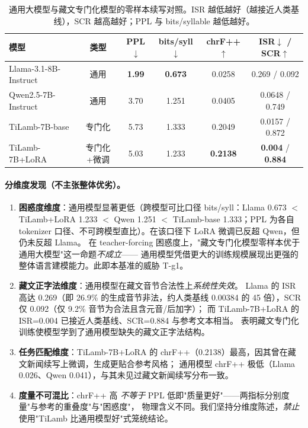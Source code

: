 \begin{table}[h]
\centering\small
\caption{通用大模型与藏文专门化模型的零样本续写对照。ISR 越低越好（越接近人类基线），SCR 越高越好；PPL 与 bits/syllable 越低越好。}
\label{tab:g1}
\begin{tabular}{lccccc}
\toprule
模型 & 类型 & PPL$\downarrow$ & bits/syll$\downarrow$ & chrF++$\uparrow$ & ISR$\downarrow$ / SCR$\uparrow$ \\
\midrule
Llama-3.1-8B-Instruct & 通用 & \textbf{1.99} & \textbf{0.673} & 0.0258 & 0.269 / 0.092 \\
Qwen2.5-7B-Instruct  & 通用 & 3.70 & 1.251 & 0.0405 & 0.0648 / 0.749 \\
TiLamb-7B-base        & 专门化 & 5.73 & 1.333 & 0.2049 & 0.0157 / 0.872 \\
TiLamb-7B+LoRA        & 专门化+微调 & 5.03 & 1.233 & \textbf{0.2138} & \textbf{0.004} / \textbf{0.884} \\
\bottomrule
\end{tabular}
\end{table}

\paragraph{分维度发现（不主张整体优劣）。}
\begin{enumerate}
\item \textbf{困惑度维度}：通用模型显著更低（跨模型可比口径 bits/syll：Llama 0.673 $<$ TiLamb+LoRA 1.233 $<$ Qwen 1.251 $<$ TiLamb-base 1.333；PPL 为各自 tokenizer 口径、不可跨模型直比）。在该口径下 LoRA 微调已反超 Qwen，但仍未反超 Llama。
在 teacher-forcing 困惑度上，"藏文专门化模型零样本优于通用大模型"这一命题\emph{不成立}——
通用模型凭借更大的训练规模展现出更强的整体语言建模能力。此即本基准的威胁 T-g1。
\item \textbf{藏文正字法维度}：通用模型在藏文音节合法性上\emph{系统性失效}。
Llama 的 ISR 高达 0.269（即 26.9\% 的生成音节非法，约人类基线 0.00384 的 45 倍），SCR 仅 0.092（仅 9.2\% 音节为合法且含元音/后加字）；
而 TiLamb-7B+LoRA 的 ISR=0.004 已接近人类基线、SCR=0.884 与参考文本相当。
表明藏文专门化训练使模型学到了通用模型缺失的藏文正字法结构。
\item \textbf{任务匹配维度}：TiLamb-7B+LoRA 的 chrF++（0.2138）最高，因其曾在藏文新闻续写上微调，生成更贴合参考风格；
通用模型 chrF++ 极低（Llama 0.026、Qwen 0.041），与其未见过藏文新闻续写分布一致。
\item \textbf{度量不可混比}：chrF++ 高 \emph{不等于} PPL 低即"质量更好"——两指标分别度量"与参考的重叠度"与"困惑度"，
物理含义不同。我们坚持分维度陈述，\emph{禁止}使用"TiLamb 比通用模型好"式笼统结论。
\end{enumerate}

